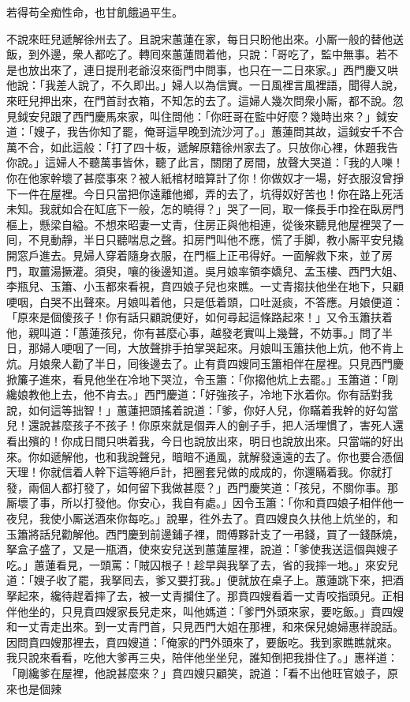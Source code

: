 若得苟全痴性命，也甘飢餓過平生。

不說來旺兒遞解徐州去了。且說宋蕙蓮在家，每日只盼他出來。小厮一般的替他送飯，到外邊，衆人都吃了。轉囘來蕙蓮問着他，只說：「哥吃了，監中無事。若不是也放出來了，連日提刑老爺沒來衙門中問事，也只在一二日來家。」西門慶又哄他說：「我差人說了，不久即出。」婦人以為信實。一日風裡言風裡語，聞得人說，來旺兒押出來，在門首討衣箱，不知怎的去了。這婦人幾次問衆小厮，都不說。忽見鉞安兒跟了西門慶馬來家，叫住問他：「你旺哥在監中好麼？幾時出來？」鉞安道：「嫂子，我告你知了罷，俺哥這早晚到流沙河了。」蕙蓮問其故，這鉞安千不合萬不合，如此這般：「打了四十板，遞解原籍徐州家去了。只放你心裡，休題我告你說。」這婦人不聽萬事皆休，聽了此言，關閉了房間，放聲大哭道：「我的人嚛！你在他家幹壞了甚麼事來？被人紙棺材暗算計了你！你做奴才一場，好衣服沒曾掙下一件在屋裡。今日只當把你遠離他鄉，弄的去了，坑得奴好苦也！你在路上死活未知。我就如合在缸底下一般，怎的曉得？」{}哭了一囘，取一條長手巾拴在臥房門樞上，懸梁自縊。不想來昭妻一丈青，住房正與他相連，從後來聽見他屋裡哭了一囘，不見動靜，半日只聽喘息之聲。扣房門叫他不應，慌了手脚，教小厮平安兒撬開窓戶進去。見婦人穿着隨身衣服，在門樞上正弔得好。一面解救下來，並了房門，取薑湯撅灌。須臾，嚷的後邊知道。吳月娘率領李嬌兒、孟玉樓、西門大姐、李瓶兒、玉簫、小玉都來看視，賁四娘子兒也來瞧。一丈青搊扶他坐在地下，只顧哽咽，白哭不出聲來。月娘叫着他，只是低着頭，口吐涎痰，不答應。月娘便道：「原來是個傻孩子！你有話只顧說便好，如何尋起這條路起來！」又令玉簫扶着他，親叫道：「蕙蓮孩兒，你有甚麼心事，越發老實叫上幾聲，不妨事。」{}問了半日，那婦人哽咽了一囘，大放聲排手拍掌哭起來。月娘叫玉簫扶他上炕，他不肯上炕。月娘衆人勸了半日，囘後邊去了。止有賁四嫂同玉簫相伴在屋裡。只見西門慶掀簾子進來，看見他坐在冷地下哭泣，令玉簫：「你搊他炕上去罷。」玉簫道：「剛纔娘教他上去，他不肯去。」西門慶道：「好強孩子，冷地下氷着你。你有話對我說，如何這等拙智！」蕙蓮把頭搖着說道：「爹，你好人兒，你瞞着我幹的好勾當兒！還說甚麼孩子不孩子！你原來就是個弄人的劊子手，把人活埋慣了，害死人還看出殯的！{}你成日間只哄着我，今日也說放出來，明日也說放出來。只當端的好出來。你如遞解他，也和我說聲兒，暗暗不通風，就解發遠遠的去了。你也要合憑個天理！你就信着人幹下這等絕戶計，把圈套兒做的成成的，你還瞞着我。你就打發，兩個人都打發了，如何留下我做甚麼？」{}西門慶笑道：「孩兒，不關你事。那厮壞了事，所以打發他。你安心，我自有處。」因令玉簫：「你和賁四娘子相伴他一夜兒，我使小厮送酒來你每吃。」說畢，徃外去了。賁四嫂良久扶他上炕坐的，和玉簫將話兒勸解他。西門慶到前邊鋪子裡，問傅夥計支了一弔錢，買了一錢酥燒，拏盒子盛了，又是一瓶酒，使來安兒送到蕙蓮屋裡，說道：「爹使我送這個與嫂子吃。」蕙蓮看見，一頭罵：「賊囚根子！趁早與我拏了去，省的我摔一地。」{}來安兒道：「嫂子收了罷，我拏囘去，爹又要打我。」便就放在桌子上。蕙蓮跳下來，把酒拏起來，纔待趕着摔了去，被一丈青攔住了。那賁四嫂看着一丈青咬指頭兒。正相伴他坐的，只見賁四嫂家長兒走來，叫他媽道：「爹門外頭來家，要吃飯。」賁四嫂和一丈青走出來。到一丈青門首，只見西門大姐在那裡，和來保兒媳婦惠祥說話。因問賁四嫂那裡去，賁四嫂道：「俺家的門外頭來了，要飯吃。我到家瞧瞧就來。我只說來看看，吃他大爹再三央，陪伴他坐坐兒，誰知倒把我掛住了。」惠祥道：「剛纔爹在屋裡，他說甚麼來？」賁四嫂只顧笑，說道：「看不出他旺官娘子，原來也是個辣